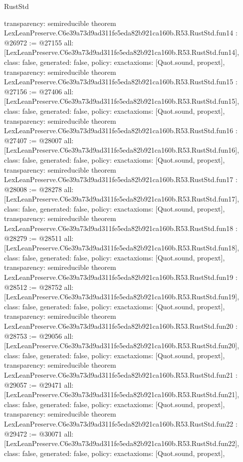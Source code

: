 \begin{lexlean}{RustStd}
\begin{coremodule}
{  transparency: semireducible
}
theorem LexLeanPreserve.C6e39a73d9ad311fe5eda82b921ca160b.R53.RustStd.fun14 : @26972 := @27155 {
  all: [LexLeanPreserve.C6e39a73d9ad311fe5eda82b921ca160b.R53.RustStd.fun14],
  class: false,
  generated: false,
  policy: exact{axioms: [Quot.sound, propext]},
  transparency: semireducible
}
theorem LexLeanPreserve.C6e39a73d9ad311fe5eda82b921ca160b.R53.RustStd.fun15 : @27156 := @27406 {
  all: [LexLeanPreserve.C6e39a73d9ad311fe5eda82b921ca160b.R53.RustStd.fun15],
  class: false,
  generated: false,
  policy: exact{axioms: [Quot.sound, propext]},
  transparency: semireducible
}
theorem LexLeanPreserve.C6e39a73d9ad311fe5eda82b921ca160b.R53.RustStd.fun16 : @27407 := @28007 {
  all: [LexLeanPreserve.C6e39a73d9ad311fe5eda82b921ca160b.R53.RustStd.fun16],
  class: false,
  generated: false,
  policy: exact{axioms: [Quot.sound, propext]},
  transparency: semireducible
}
theorem LexLeanPreserve.C6e39a73d9ad311fe5eda82b921ca160b.R53.RustStd.fun17 : @28008 := @28278 {
  all: [LexLeanPreserve.C6e39a73d9ad311fe5eda82b921ca160b.R53.RustStd.fun17],
  class: false,
  generated: false,
  policy: exact{axioms: [Quot.sound, propext]},
  transparency: semireducible
}
theorem LexLeanPreserve.C6e39a73d9ad311fe5eda82b921ca160b.R53.RustStd.fun18 : @28279 := @28511 {
  all: [LexLeanPreserve.C6e39a73d9ad311fe5eda82b921ca160b.R53.RustStd.fun18],
  class: false,
  generated: false,
  policy: exact{axioms: [Quot.sound, propext]},
  transparency: semireducible
}
theorem LexLeanPreserve.C6e39a73d9ad311fe5eda82b921ca160b.R53.RustStd.fun19 : @28512 := @28752 {
  all: [LexLeanPreserve.C6e39a73d9ad311fe5eda82b921ca160b.R53.RustStd.fun19],
  class: false,
  generated: false,
  policy: exact{axioms: [Quot.sound, propext]},
  transparency: semireducible
}
theorem LexLeanPreserve.C6e39a73d9ad311fe5eda82b921ca160b.R53.RustStd.fun20 : @28753 := @29056 {
  all: [LexLeanPreserve.C6e39a73d9ad311fe5eda82b921ca160b.R53.RustStd.fun20],
  class: false,
  generated: false,
  policy: exact{axioms: [Quot.sound, propext]},
  transparency: semireducible
}
theorem LexLeanPreserve.C6e39a73d9ad311fe5eda82b921ca160b.R53.RustStd.fun21 : @29057 := @29471 {
  all: [LexLeanPreserve.C6e39a73d9ad311fe5eda82b921ca160b.R53.RustStd.fun21],
  class: false,
  generated: false,
  policy: exact{axioms: [Quot.sound, propext]},
  transparency: semireducible
}
theorem LexLeanPreserve.C6e39a73d9ad311fe5eda82b921ca160b.R53.RustStd.fun22 : @29472 := @30071 {
  all: [LexLeanPreserve.C6e39a73d9ad311fe5eda82b921ca160b.R53.RustStd.fun22],
  class: false,
  generated: false,
  policy: exact{axioms: [Quot.sound, propext]},
}
\end{coremodule}
\end{lexlean}
